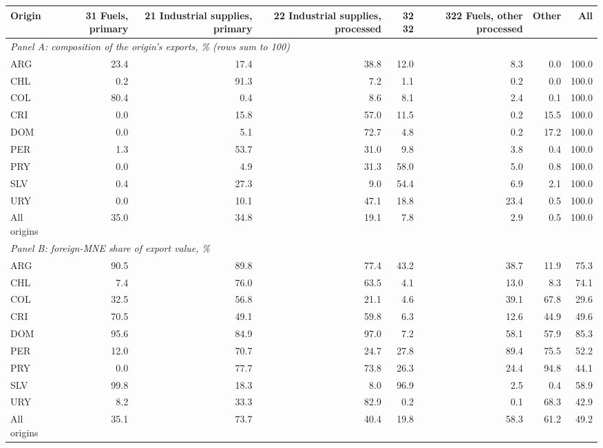 \begin{tabular}{lrrrrrrr}
\toprule
Origin & 31 Fuels, primary & 21 Industrial supplies, primary & 22 Industrial supplies, processed & 32 32 & 322 Fuels, other processed & Other & All \\
\midrule
\multicolumn{8}{l}{\textit{Panel A: composition of the origin's exports, \% (rows sum to 100)}} \\
ARG & 23.4 & 17.4 & 38.8 & 12.0 & 8.3 & 0.0 & 100.0 \\
CHL & 0.2 & 91.3 & 7.2 & 1.1 & 0.2 & 0.0 & 100.0 \\
COL & 80.4 & 0.4 & 8.6 & 8.1 & 2.4 & 0.1 & 100.0 \\
CRI & 0.0 & 15.8 & 57.0 & 11.5 & 0.2 & 15.5 & 100.0 \\
DOM & 0.0 & 5.1 & 72.7 & 4.8 & 0.2 & 17.2 & 100.0 \\
PER & 1.3 & 53.7 & 31.0 & 9.8 & 3.8 & 0.4 & 100.0 \\
PRY & 0.0 & 4.9 & 31.3 & 58.0 & 5.0 & 0.8 & 100.0 \\
SLV & 0.4 & 27.3 & 9.0 & 54.4 & 6.9 & 2.1 & 100.0 \\
URY & 0.0 & 10.1 & 47.1 & 18.8 & 23.4 & 0.5 & 100.0 \\
All origins & 35.0 & 34.8 & 19.1 & 7.8 & 2.9 & 0.5 & 100.0 \\
\midrule
\multicolumn{8}{l}{\textit{Panel B: foreign-MNE share of export value, \%}} \\
ARG & 90.5 & 89.8 & 77.4 & 43.2 & 38.7 & 11.9 & 75.3 \\
CHL & 7.4 & 76.0 & 63.5 & 4.1 & 13.0 & 8.3 & 74.1 \\
COL & 32.5 & 56.8 & 21.1 & 4.6 & 39.1 & 67.8 & 29.6 \\
CRI & 70.5 & 49.1 & 59.8 & 6.3 & 12.6 & 44.9 & 49.6 \\
DOM & 95.6 & 84.9 & 97.0 & 7.2 & 58.1 & 57.9 & 85.3 \\
PER & 12.0 & 70.7 & 24.7 & 27.8 & 89.4 & 75.5 & 52.2 \\
PRY & 0.0 & 77.7 & 73.8 & 26.3 & 24.4 & 94.8 & 44.1 \\
SLV & 99.8 & 18.3 & 8.0 & 96.9 & 2.5 & 0.4 & 58.9 \\
URY & 8.2 & 33.3 & 82.9 & 0.2 & 0.1 & 68.3 & 42.9 \\
All origins & 35.1 & 73.7 & 40.4 & 19.8 & 58.3 & 61.2 & 49.2 \\
\bottomrule
\end{tabular}
